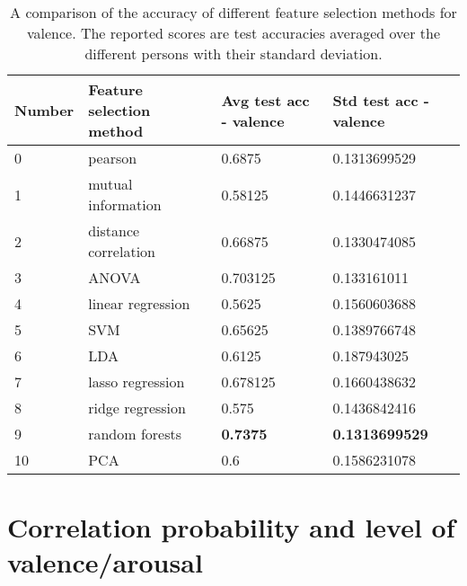 \begin{table}[H]
\centering
\caption{A comparison of the accuracy of different feature selection methods for valence. The reported scores are test accuracies averaged over the different persons with their standard deviation.\label{accCompLblvalence}}
\begin{tabular}{llll}
\textbf{Number} & \textbf{Feature selection method} & \textbf{Avg test acc - valence} & \textbf{Std test acc - valence} \\ \hline
0               & pearson                           & 0.6875                              & 0.1313699529                    \\
1               & mutual information                & 0.58125                             & 0.1446631237                    \\
2               & distance correlation              & 0.66875                             & 0.1330474085                    \\
3               & ANOVA                             & 0.703125                            & 0.133161011                     \\
4               & linear regression                 & 0.5625                              & 0.1560603688                    \\
5               & SVM                               & 0.65625                             & 0.1389766748                    \\
6               & LDA                               & 0.6125                              & 0.187943025                     \\
7               & lasso regression                  & 0.678125                            & 0.1660438632                    \\
8               & ridge regression                  & 0.575                               & 0.1436842416                    \\
9               & random forests                    & \textbf{0.7375}                     & \textbf{0.1313699529}           \\
10              & PCA                               & 0.6                                 & 0.1586231078                   
\end{tabular}
\end{table}

\section{Correlation probability and level of valence/arousal}

